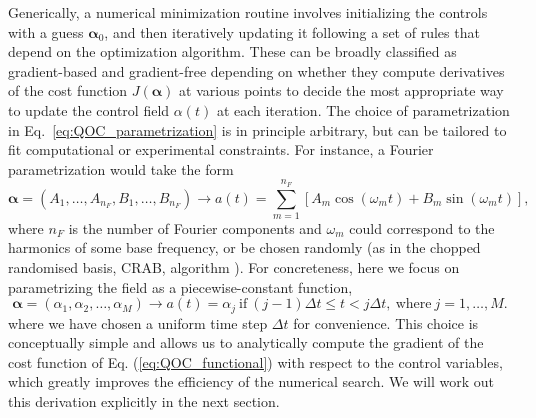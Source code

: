 Generically, a numerical minimization routine involves initializing the controls with a guess $\bm{\alpha}_{0}$, and then iteratively updating it following a set of rules that depend on the optimization algorithm. These can be broadly classified as gradient-based and gradient-free depending on whether they compute derivatives of the cost function $J(\bm{\alpha})$ at various points to decide the most appropriate way to update the control field $\alpha(t)$ at each iteration. The choice of parametrization in Eq.~\eqref{eq:QOC_parametrization} is in principle arbitrary, but can be tailored to fit computational or experimental constraints. For instance, a Fourier parametrization would take the form
\begin{equation}
    \bm{\alpha} = (A_1,\ldots,A_{n_F},B_1,\ldots,B_{n_F})\rightarrow a(t) = \sum\limits_{m=1}^{n_F}\left[A_m \cos(\omega_m t) + B_m\sin(\omega_m t)\right], 
    \label{eq:QOC_fourier}
\end{equation}
where $n_F$ is the number of Fourier components and $\omega_m$ could correspond to the harmonics of some base frequency, or be chosen randomly (as in the chopped randomised basis, CRAB, algorithm \cite{doria2011_crab}). For concreteness, here we focus on parametrizing the field as a piecewise-constant function, 
\begin{equation}
\bm{\alpha} = (\alpha_1,\alpha_2,\ldots,\alpha_M)\rightarrow a(t) = \alpha_j\ \text{if}\ (j-1)\Delta t \leq t < j\Delta t,\ \text{where}\  j=1,\ldots,M.
\label{eq:QOC_pwc}
\end{equation}
where we have chosen a uniform time step $\Delta t$ for convenience. This choice is conceptually simple and allows us to analytically compute the gradient of the cost function of Eq. (\ref{eq:QOC_functional}) with respect to the control variables, which greatly improves the efficiency of the numerical search. We will work out this derivation explicitly in the next section.

